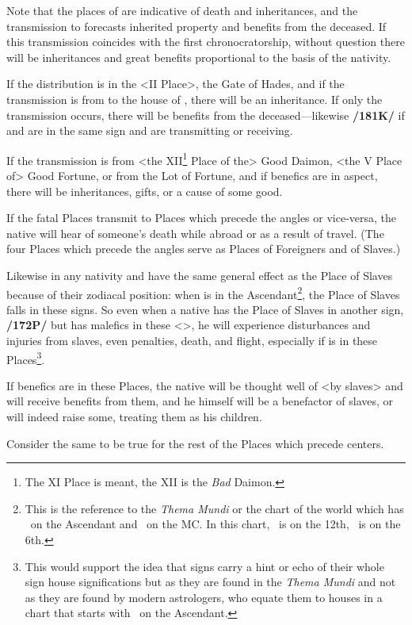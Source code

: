  
Note that the places of \Saturn\xspace are indicative of death and inheritances, and the transmission to \Jupiter\xspace forecasts inherited property and benefits from the deceased.
If this transmission coincides with the first chronocratorship, without question there will be inheritances and great benefits proportional to the basis of the nativity. 

If the distribution is in the <II Place>, the Gate of Hades, and if the transmission is from \Saturn\xspace to the house of \Jupiter, there will be an inheritance. If only
the transmission occurs, there will be benefits from the deceased—likewise \textbf{/181K/} if \Saturn\xspace and \Jupiter\xspace are in the same sign and are transmitting or receiving.

If the transmission is from <the XII\footnote{The XI Place is meant, the XII is the \textsl{Bad} Daimon.} Place of the> Good Daimon, <the V Place of> Good Fortune, or from the Lot of Fortune, and if benefics are in aspect, there will be inheritances, gifts, or a cause of some good. 

If the fatal Places transmit to Places which precede the angles or vice-versa, the native will hear of someone’s death while abroad or as a result of travel. (The four Places which precede the angles serve as Places of Foreigners and of Slaves.)

 Likewise in any nativity \Gemini\xspace and \Sagittarius\xspace have the same general effect as the Place of Slaves because of their zodiacal position: when \Cancer\xspace is in the Ascendant\footnote{This is the reference to the \textsl{Thema Mundi} or the chart of the world which has \Cancer\, on the Ascendant and \Aries\, on the MC. In this chart, \Gemini\, is on the 12th, \Sagittarius\, is on the 6th.}, the Place of Slaves falls in these signs. So even when a native has the Place of Slaves in another sign, \textbf{/172P/} but has malefics in these <\Gemini\xspace [or] \Sagittarius>, he will experience disturbances and injuries from slaves, even penalties, death, and flight, especially if \Saturn\xspace is in these Places\footnote{This would support the idea that signs carry a hint or echo of their whole sign house significations but as they are found in the \textsl{Thema Mundi} and not as they are found by modern astrologers, who equate them to houses in a chart that starts with \Aries\, on the Ascendant.}. 
 
 If benefics are in these Places, the native will be thought well of <by slaves> and will receive benefits from them, and he himself will be a benefactor of slaves, or will indeed raise some, treating them as his children.
 
Consider the same to be true for the rest of the Places which precede centers.

\newpage
